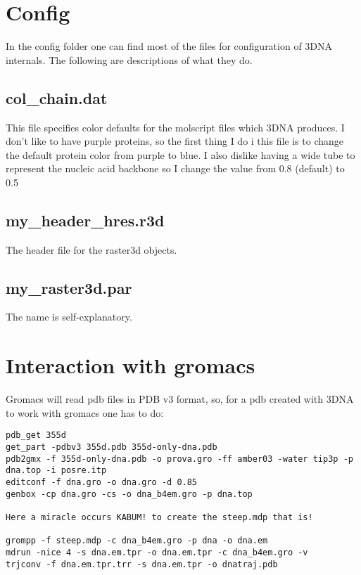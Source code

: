 \section{Config}
In the config folder one can  find most of the files for configuration
of 3DNA internals. The following are descriptions of what they do.

\subsection{col\_chain.dat}
This file specifies color defaults  for the molscript files which 3DNA
produces. I don't  like to have purple proteins, so  the first thing I
do i this  file is to change the default protein  color from purple to
blue. I also dislike having a  wide tube to represent the nucleic acid
backbone so I change the value from 0.8 (default) to 0.5

\subsection{my\_header\_hres.r3d}
The header file for the raster3d objects. 

\subsection{my\_raster3d.par}
The name is self-explanatory.


\section{Interaction with gromacs}
Gromacs will read  pdb files in PDB  v3 format, so, for  a pdb created
with 3DNA to work with gromacs one has to do:

\begin{Verbatim}
pdb_get 355d
get_part -pdbv3 355d.pdb 355d-only-dna.pdb
pdb2gmx -f 355d-only-dna.pdb -o prova.gro -ff amber03 -water tip3p -p dna.top -i posre.itp
editconf -f dna.gro -o dna.gro -d 0.85
genbox -cp dna.gro -cs -o dna_b4em.gro -p dna.top

Here a miracle occurs KABUM! to create the steep.mdp that is!

grompp -f steep.mdp -c dna_b4em.gro -p dna -o dna.em
mdrun -nice 4 -s dna.em.tpr -o dna.em.tpr -c dna_b4em.gro -v
trjconv -f dna.em.tpr.trr -s dna.em.tpr -o dnatraj.pdb 
\end{Verbatim}







